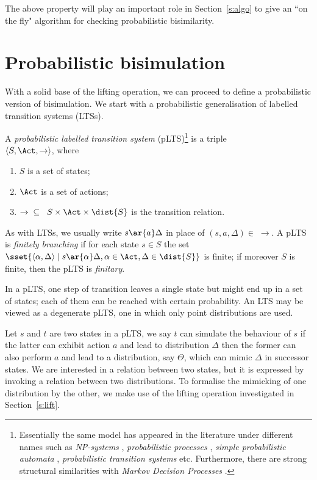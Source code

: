 \documentclass{article}
\begin{document}
The above property will play an important role in
Section~\ref{s:algo} to give an ``on the fly" algorithm for checking
probabilistic bisimilarity.

\section{Probabilistic bisimulation}\label{s:pbisi}
With a solid base of the lifting operation, we can proceed to define
a probabilistic version of bisimulation. We start with a
probabilistic generalisation of labelled transition systems (LTSs).
\begin{definition}
A \emph{probabilistic labelled transition
system}
(pLTS)\footnote{Essentially the same model has appeared in the
literature under different names such as \emph{NP-systems}
\cite{JHW94}, \emph{probabilistic processes} \cite{JW95},
\emph{simple probabilistic automata} \cite{Seg95},
\emph{probabilistic transition systems} \cite{JW02} etc.
Furthermore, there are strong structural similarities with
\emph{Markov
  Decision Processes} \cite{Put94,DGMZ07}.} is a triple\\
$\langle S, \Act, \rightarrow \rangle$, where
\begin{enumerate}
\item $S$ is a set of states;
\item $\Act$ is a set of actions;
\item $\rightarrow \;\;\subseteq\;\; S \times \Act \times \dist{S}$ is the transition relation.
\end{enumerate}
As with LTSs, we usually write $s \ar{a} \Delta$ in place of
$(s,a,\Delta) \in \;\rightarrow$.
A pLTS is \emph{finitely branching} if for each state $s\in S$ the
set $\sset{\langle \alpha,\Delta\rangle\mid s\ar{\alpha}\Delta,
\alpha\in \Act, \Delta\in\dist{S}}$ is finite; if moreover $S$ is
finite, then the pLTS is \emph{finitary}.
\end{definition}

In a pLTS, one step of transition leaves a single state but might
end up in a set of states; each of them can be reached with certain
probability. An LTS may be viewed as a degenerate pLTS, one in which
only point distributions are used.

Let $s$ and $t$ are two states in a pLTS, we say $t$ can simulate
the behaviour of $s$ if the latter can exhibit action $a$ and lead
to distribution $\Delta$ then the former can also perform $a$ and
lead to a distribution, say $\Theta$, which can mimic $\Delta$ in
successor states. We are interested in a relation between two
states, but it is expressed by invoking a relation between two
distributions. To formalise the mimicking of one distribution by the
other, we make use of the lifting operation investigated in
Section~\ref{s:lift}.
\end{document}
